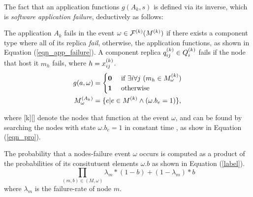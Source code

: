 The fact that an application functions $g(A_k, s)$ is defined via its inverse, which is \textit{software application failure}, deductively as follows:
\begin{definition}
The application $A_k$ fails in the event $\omega \in \ssp{\mathcal{F}}(\ssp{M})$ if there exists a component type  where all of its replica  \textit{fail}, otherwise, the application functions, as shown in Equation (\ref{eqn_app_failure}).  A component replica $\sss{q}[k][ij]\in \sss{Q}$ fails if the node that host it $m_h$ fails, where $h=x^{(k)}_{ij}$.  
\begin{align}
\label{eqn_app_failure}
g(a, \omega)&= 
\begin{cases}
\textbf{0} & \mbox{ if } \exists i\forall j\ (m_h\in \sss{M}[k][\omega] )\\
\textbf{1} & \mbox{ otherwise }
\end{cases}\\
\label{eqn_appreliability_node_s}
\sss{M}[A_k][\omega]&=\{e|e\in \ssp{M} \land (\omega.b_e=1) \},
\end{align}
\end{definition}
where [k][\omega] denote the nodes that function at the event $\omega$, and can be found by searching the nodes  with state $\omega.b_e=1$ in constant time , as show in Equation (\ref{eqn_pro}).

The probability that a nodes-failure event $\omega$ occurs is computed as a product of the probabilities of its consitutuent elements $\omega.b$ as shown in Equation (\ref{label}).
\begin{equation}
\label{eqn_pro}
	\prod_{(m,b)\in (M,\omega)}{\lambda_m*(1-b)+(1-\lambda_m)*b}
\end{equation}
where $\lambda_m$ is the failure-rate of node $m$.


